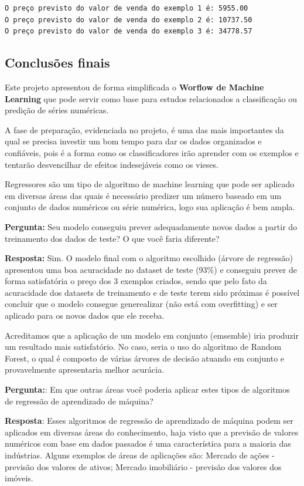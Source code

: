 \documentclass[11pt]{article}
\begin{document}
    \begin{Verbatim}[commandchars=\\\{\}]
O preço previsto do valor de venda do exemplo 1 é: 5955.00
O preço previsto do valor de venda do exemplo 2 é: 10737.50
O preço previsto do valor de venda do exemplo 3 é: 34778.57

    \end{Verbatim}

    \subsection{Conclusões finais}\label{conclusuxf5es-finais}

Este projeto apresentou de forma simplificada o \textbf{Worflow de
Machine Learning} que pode servir como base para estudos relacionados a
classificação ou predição de séries numéricas.

A fase de preparação, evidenciada no projeto, é uma das mais importantes
da qual se precisa investir um bom tempo para dar os dados organizados e
confiáveis, pois é a forma como os classificadores irão aprender com os
exemplos e tentarão desvencilhar de efeitos indesejáveis como os vieses.

Regressores são um tipo de algoritmo de machine learning que pode ser
aplicado em diversas áreas das quais é necessário predizer um número
baseado em um conjunto de dados numéricos ou série numérica, logo sua
aplicação é bem ampla.

    \textbf{Pergunta:} Seu modelo conseguiu prever adequadamente novos dados
a partir do treinamento dos dados de teste? O que você faria diferente?

\textbf{Resposta:} Sim. O modelo final com o algoritmo escolhido (árvore
de regressão) apresentou uma boa acuracidade no dataset de teste (93\%)
e conseguiu prever de forma satisfatória o preço dos 3 exemplos criados,
sendo que pelo fato da acuracidade dos datasets de treinamento e de
teste terem sido próximas é possível concluir que o modelo consegue
generealizar (não está com overfitting) e ser aplicado para os novos
dados que ele receba.

Acreditamos que a aplicação de um modelo em conjunto (emsemble) iria
produzir um resultado mais satisfatório. No caso, seria o uso do
algoritmo de Random Forest, o qual é composto de várias árvores de
decisão atuando em conjunto e provavelmente apresentaria melhor
acurácia.

    \textbf{Pergunta:}: Em que outras áreas você poderia aplicar estes tipos
de algoritmos de regressão de aprendizado de máquina?

\textbf{Resposta}: Esses algoritmos de regressão de aprendizado de
máquina podem ser aplicados em diversas áreas do conhecimento, haja
visto que a previsão de valores numéricos com base em dados passados é
uma característica para a maioria das indústrias. Alguns exemplos de
áreas de aplicações são: Mercado de ações - previsão dos valores de
ativos; Mercado imobiliário - previsão dos valores dos imóveis.


    
    
    
    
\end{document}
